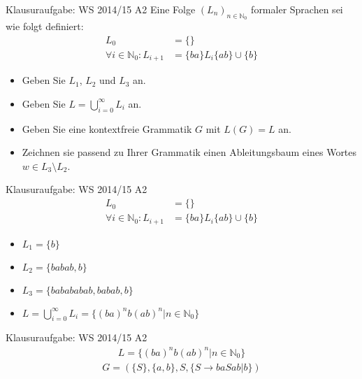 \begin{frame}{Klausuraufgabe: WS 2014/15 A2}
  Eine Folge $(L_n)_{n\in\mathbb{N}_0}$ formaler Sprachen sei wie folgt definiert:
  \begin{align*}
    L_0&=\{\}\\
    \forall i\in \mathbb{N}_0:L_{i+1}&=\{ba\}L_i\{ab\}\cup\{b\}
  \end{align*}
  \begin{itemize}
    \item Geben Sie $L_1$, $L_2$ und $L_3$ an.
    \item Geben Sie $L=\bigcup\limits_{i=0}^\infty L_i$ an.
    \item Geben Sie eine kontextfreie Grammatik $G$ mit $L(G)=L$ an.
    \item Zeichnen sie passend zu Ihrer Grammatik einen Ableitungsbaum eines Wortes $w\in L_3 \setminus L_2$.
  \end{itemize}
\end{frame}

\begin{frame}{Klausuraufgabe: WS 2014/15 A2}
  \begin{align*}
    L_0&=\{\}\\
    \forall i\in \mathbb{N}_0:L_{i+1}&=\{ba\}L_i\{ab\}\cup\{b\}
  \end{align*}
  \begin{itemize}
    \item $L_1=\{b\}$
    \pause
    \item $L_2=\{babab,b\}$
    \pause
    \item $L_3=\{babababab,babab,b\}$
    \pause
    \item $L=\bigcup\limits_{i=0}^\infty L_i=$\pause $\{(ba)^nb(ab)^n|n\in \mathbb{N}_0\}$
  \end{itemize}
\end{frame}

\begin{frame}{Klausuraufgabe: WS 2014/15 A2}
  \begin{align*}
    L=\{(ba)^nb(ab)^n|n\in \mathbb{N}_0\}
  \end{align*}
  \pause
  \begin{align*}
    G=(\{S\},\{a,b\},S,\{S\rightarrow baSab | b\})
  \end{align*}
\end{frame}

